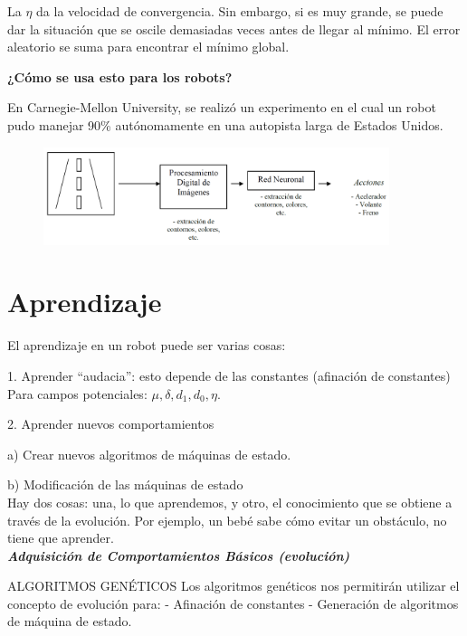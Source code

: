 La $\eta$ da la velocidad de convergencia. Sin embargo, si es muy grande, se puede dar la situación que se oscile
demasiadas veces antes de llegar al mínimo.
El error aleatorio se suma para encontrar el mínimo global.

\textbf{¿Cómo se usa esto para los robots?}

En Carnegie-Mellon University, se realizó un experimento en el cual un robot pudo manejar 90\% autónomamente en una autopista larga de Estados Unidos.

\begin{figure}[h!]
	\centering
	\includegraphics[width=0.9\textwidth]{images/img80.png}
	\label{figura80}
\end{figure}


\section{Aprendizaje}

El aprendizaje en un robot puede ser varias cosas:

1. Aprender “audacia”: esto depende de las constantes (afinación de constantes)
Para campos potenciales: $\mu, \delta, d_1, d_0, \eta $.

2. Aprender nuevos comportamientos

a) Crear nuevos algoritmos de máquinas de estado.

b) Modificación de las máquinas de estado \\

Hay dos cosas: una, lo que aprendemos, y otro, el conocimiento que se obtiene a través de la evolución. Por
ejemplo, un bebé sabe cómo evitar un obstáculo, no tiene que aprender. \\



\textbf{\textit{Adquisición de Comportamientos Básicos (evolución)}}

ALGORITMOS GENÉTICOS
Los algoritmos genéticos nos permitirán utilizar el concepto de evolución para:
- Afinación de constantes
- Generación de algoritmos de máquina de estado. \\


